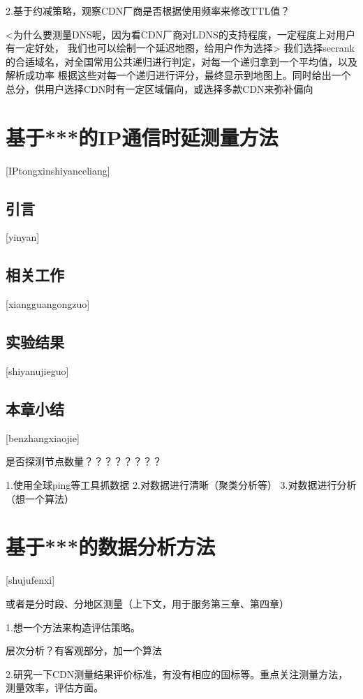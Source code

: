 2.基于约减策略，观察CDN厂商是否根据使用频率来修改TTL值？


<为什么要测量DNS呢，因为看CDN厂商对LDNS的支持程度，一定程度上对用户有一定好处，
我们也可以绘制一个延迟地图，给用户作为选择>
我们选择secrank的合适域名，对全国常用公共递归进行判定，对每一个递归拿到一个平均值，以及解析成功率
根据这些对每一个递归进行评分，最终显示到地图上。同时给出一个总分，供用户选择CDN时有一定区域偏向，或选择多款CDN来弥补偏向


\chapter{基于***的IP通信时延测量方法}[IPtongxinshiyanceliang]
\section{引言}[yinyan]
\section{相关工作}[xiangguangongzuo]
\section{实验结果}[shiyanujieguo]
\section{本章小结}[benzhangxiaojie]

是否探测节点数量？？？？？？？？

1.使用全球ping等工具抓数据
2.对数据进行清晰（聚类分析等）
3.对数据进行分析（想一个算法）




\chapter{基于***的数据分析方法}[shujufenxi]

或者是分时段、分地区测量（上下文，用于服务第三章、第四章）

1.想一个方法来构造评估策略。

层次分析？有客观部分，加一个算法


2.研究一下CDN测量结果评价标准，有没有相应的国标等。重点关注测量方法，测量效率，评估方面。







